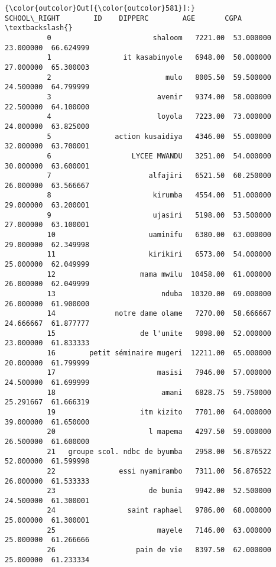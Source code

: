 \documentclass[11pt]{article}
\begin{document}
            \begin{Verbatim}[commandchars=\\\{\}]
{\color{outcolor}Out[{\color{outcolor}581}]:}                     SCHOOL\_RIGHT        ID    DIPPERC        AGE       CGPA  \textbackslash{}
          0                        shaloom   7221.00  53.000000  23.000000  66.624999   
          1                 it kasabinyole   6948.00  50.000000  27.000000  65.300003   
          2                           mulo   8005.50  59.500000  24.500000  64.799999   
          3                         avenir   9374.00  58.000000  22.500000  64.100000   
          4                         loyola   7223.00  73.000000  24.000000  63.825000   
          5               action kusaidiya   4346.00  55.000000  32.000000  63.700001   
          6                   LYCEE MWANDU   3251.00  54.000000  30.000000  63.600001   
          7                       alfajiri   6521.50  60.250000  26.000000  63.566667   
          8                        kirumba   4554.00  51.000000  29.000000  63.200001   
          9                        ujasiri   5198.00  53.500000  27.000000  63.100001   
          10                      uaminifu   6380.00  63.000000  29.000000  62.349998   
          11                      kirikiri   6573.00  54.000000  25.000000  62.049999   
          12                    mama mwilu  10458.00  61.000000  26.000000  62.049999   
          13                         nduba  10320.00  69.000000  26.000000  61.900000   
          14              notre dame olame   7270.00  58.666667  24.666667  61.877777   
          15                    de l'unite   9098.00  52.000000  23.000000  61.833333   
          16        petit séminaire mugeri  12211.00  65.000000  20.000000  61.799999   
          17                        masisi   7946.00  57.000000  24.500000  61.699999   
          18                         amani   6828.75  59.750000  25.291667  61.666319   
          19                    itm kizito   7701.00  64.000000  39.000000  61.650000   
          20                      l mapema   4297.50  59.000000  26.500000  61.600000   
          21   groupe scol. ndbc de byumba   2958.00  56.876522  52.000000  61.599998   
          22               essi nyamirambo   7311.00  56.876522  26.000000  61.533333   
          23                      de bunia   9942.00  52.500000  24.500000  61.300001   
          24                 saint raphael   9786.00  68.000000  25.000000  61.300001   
          25                        mayele   7146.00  63.000000  25.000000  61.266666   
          26                   pain de vie   8397.50  62.000000  25.000000  61.233334   

\end{Verbatim}
\end{document}
